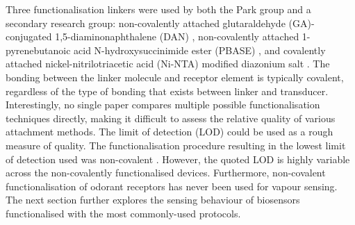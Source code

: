 \documentclass[
  a4paper,
]{scrbook}
\begin{document}
Three functionalisation linkers were used by both the Park group and a
secondary research group: non-covalently attached glutaraldehyde
(GA)-conjugated 1,5-diaminonaphthalene (DAN)
\autocite{Kwon2015,Goodwin2021}, non-covalently attached
1-pyrenebutanoic acid N-hydroxysuccinimide ester (PBASE)
\autocite{Murugathas2020,Yoo2022}, and covalently attached
nickel-nitrilotriacetic acid (Ni-NTA) modified diazonium salt
\autocite{Goldsmith2011,Son2017}. The bonding between the linker
molecule and receptor element is typically covalent, regardless of the
type of bonding that exists between linker and transducer.
Interestingly, no single paper compares multiple possible
functionalisation techniques directly, making it difficult to assess the
relative quality of various attachment methods. The limit of detection
(LOD) could be used as a rough measure of quality. The functionalisation
procedure resulting in the lowest limit of detection used was
non-covalent \autocite{Park2012}. However, the quoted LOD is highly
variable across the non-covalently functionalised devices. Furthermore,
non-covalent functionalisation of odorant receptors has never been used
for vapour sensing. The next section further explores the sensing
behaviour of biosensors functionalised with the most commonly-used
protocols.

\newpage
\thispagestyle{empty}
\end{document}

